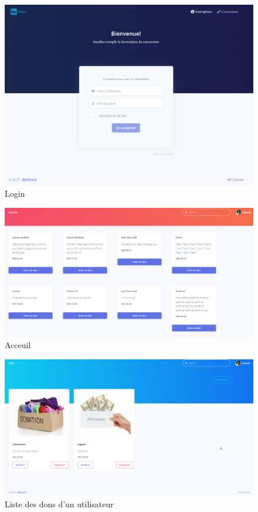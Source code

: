 \begin{figure}[!h]
\begin{center}
\includegraphics[width=17cm]{Login.png}
\caption{Login}
\end{center}
\end{figure}




\begin{figure}[!h]
\begin{center}
\includegraphics[width=17cm]{Acceuil.png}
\caption{Acceuil}
\end{center}
\end{figure}


\begin{figure}[!h]
\begin{center}
\includegraphics[width=17cm]{dons.png}
\caption{Liste des dons d'un utilisateur}
\end{center}
\end{figure}


